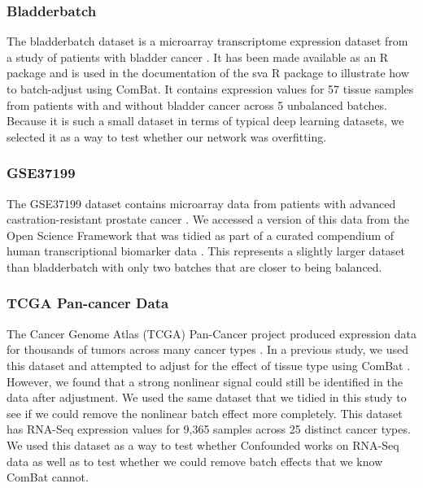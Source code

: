 \documentclass[notitlepage]{article}
\begin{document}
\subsubsection{Bladderbatch}

The bladderbatch dataset is a microarray transcriptome expression dataset from a study of patients with bladder cancer \cite{dyrskjot_gene_2004}.
It has been made available as an R package \cite{leek_bladderbatch_2017} and is used in the documentation of the sva R package \cite{leek_sva_2017} to illustrate how to batch-adjust using ComBat.
It contains expression values for 57 tissue samples from patients with and without bladder cancer across 5 unbalanced batches.
Because it is such a small dataset in terms of typical deep learning datasets, we selected it as a way to test whether our network was overfitting.

\subsubsection{GSE37199}

The GSE37199 dataset contains microarray data from patients with advanced castration-resistant prostate cancer \cite{olmos_prognostic_2012}.
We accessed a version of this data from the Open Science Framework that was tidied as part of a curated compendium of human transcriptional biomarker data \cite{golightly_curated_2018}.
This represents a slightly larger dataset than bladderbatch with only two batches that are closer to being balanced.

\subsubsection{TCGA Pan-cancer Data}

The Cancer Genome Atlas (TCGA) Pan-Cancer project produced expression data for thousands of tumors across many cancer types \cite{the_cancer_genome_atlas_research_network_cancer_2013}.
In a previous study, we used this dataset and attempted to adjust for the effect of tissue type using ComBat \cite{dayton_classifying_2017-1}.
However, we found that a strong nonlinear signal could still be identified in the data after adjustment.
We used the same dataset that we tidied in this study to see if we could remove the nonlinear batch effect more completely.
This dataset has RNA-Seq expression values for 9,365 samples across 25 distinct cancer types.
We used this dataset as a way to test whether Confounded works on RNA-Seq data as well as to test whether we could remove batch effects that we know ComBat cannot.
\end{document}
